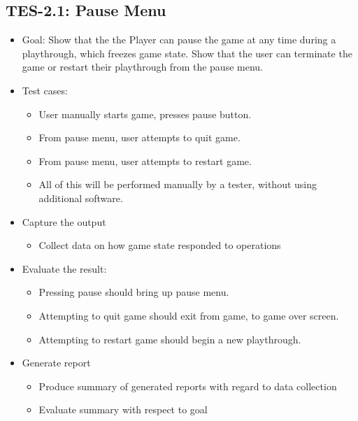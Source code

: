 \subsection{TES-2.1: Pause Menu }
\begin{itemize}
\item Goal: Show that the the Player can pause the game at any time during
a playthrough, which freezes game state. Show that the user can terminate
the game or restart their playthrough from the pause menu.
\item Test cases: 

\begin{itemize}
\item User manually starts game, presses pause button. 
\item From pause menu, user attempts to quit game. 
\item From pause menu, user attempts to restart game.
\item All of this will be performed manually by a tester, without using additional software.
\end{itemize}
\item Capture the output 

\begin{itemize}
\item Collect data on how game state responded to operations 
\end{itemize}
\item Evaluate the result: 

\begin{itemize}
\item Pressing pause should bring up pause menu. 
\item Attempting to quit game should exit from game, to game over screen. 
\item Attempting to restart game should begin a new playthrough. 
\end{itemize}
\item Generate report 

\begin{itemize}
\item Produce summary of generated reports with regard to data collection 
\item Evaluate summary with respect to goal
\end{itemize}
\end{itemize}


